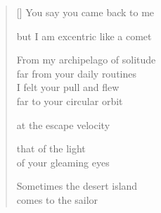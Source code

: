 \documentclass[11pt,a4paper]{article}
\begin{document}
\thispagestyle{empty}

\poemtitle{}

\settowidth{\versewidth}{From my archipelago of solitude}

\bigskip

\begin{verse}[\versewidth]
  You say you came back to me

  but I am excentric like a comet

  From my archipelago of solitude \\
  far from your daily routines\\
  I felt your pull and flew\\
  far to your circular orbit

  at the escape velocity

  that of the light \\
  of your gleaming eyes

  Sometimes the desert island \\
  comes to the sailor
\end{verse}
\end{document}
